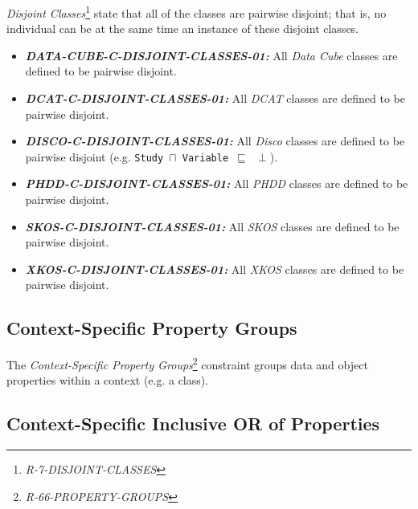 \documentclass{llncs}
\newcommand{\ms}[1]{\texttt{#1}}
\begin{document}
{\em Disjoint Classes}\footnote{{\em R-7-DISJOINT-CLASSES}} state that all of the classes are pairwise disjoint; 
that is, no individual can be at the same time an instance of these disjoint classes.

\begin{itemize}
	\item \textbf{{\em DATA-CUBE-C-DISJOINT-CLASSES-01:}} 
All \emph{Data Cube} classes are defined to be pairwise disjoint.
\end{itemize}

\begin{itemize}
	\item \textbf{{\em DCAT-C-DISJOINT-CLASSES-01:}} 
All \emph{DCAT} classes are defined to be pairwise disjoint.
\end{itemize}

\begin{itemize}
	\item \textbf{{\em DISCO-C-DISJOINT-CLASSES-01:}} 
All \emph{Disco} classes are defined to be pairwise disjoint (e.g. \ms{Study $\sqcap$ Variable $\sqsubseteq$ $\perp$}).
\end{itemize}

\begin{itemize}
	\item \textbf{{\em PHDD-C-DISJOINT-CLASSES-01:}} 
All \emph{PHDD} classes are defined to be pairwise disjoint.
\end{itemize}

\begin{itemize}
	\item \textbf{{\em SKOS-C-DISJOINT-CLASSES-01:}} 
All \emph{SKOS} classes are defined to be pairwise disjoint.
\end{itemize}

\begin{itemize}
	\item \textbf{{\em XKOS-C-DISJOINT-CLASSES-01:}} 
All \emph{XKOS} classes are defined to be pairwise disjoint.
\end{itemize}

\subsection{Context-Specific Property Groups}

The \emph{Context-Specific Property Groups}\footnote{\emph{R-66-PROPERTY-GROUPS}} constraint groups data and object properties within a context (e.g. a class).

\subsection{Context-Specific Inclusive OR of Properties}
\end{document}
